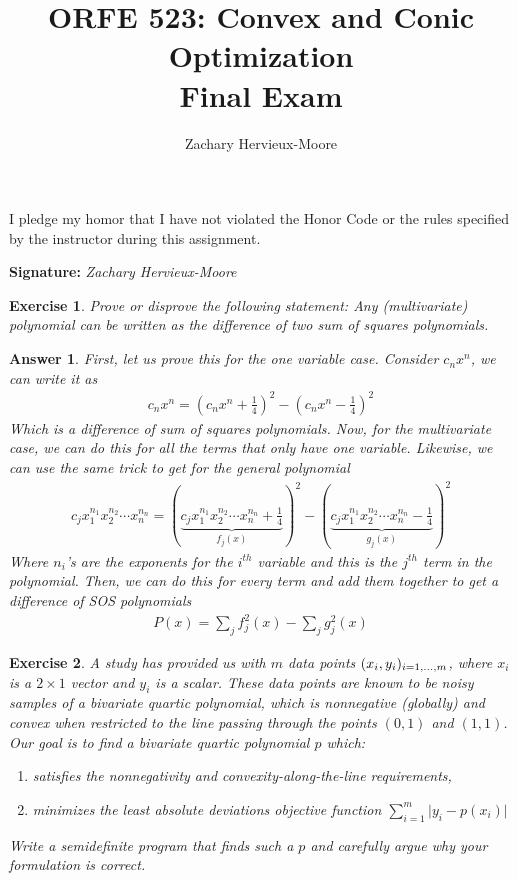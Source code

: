 \documentclass[12pt]{article}
\title{ORFE 523: Convex and Conic Optimization \\ Final Exam}
\author{Zachary Hervieux-Moore}
\date{\displaydate{date}}
\theoremstyle{colon}
\newtheorem{exercise}{Exercise}
\newtheorem*{answer}{Answer}
\begin{document}
\maketitle

I pledge my homor that I have not violated the Honor Code or the rules specified by the instructor during this assignment.

\textbf{Signature: } \textit{Zachary Hervieux-Moore}

\clearpage

\begin{exercise}
  Prove or disprove the following statement: Any (multivariate) polynomial can be written as the difference of two sum of squares polynomials.
\end{exercise}

\begin{answer}
  First, let us prove this for the one variable case. Consider $c_n x^n$, we can write it as
  \begin{gather*}
    c_n x^n = \left(c_n x^n + \frac{1}{4} \right)^2 - \left(c_n x^n - \frac{1}{4} \right)^2
  \end{gather*}
  Which is a difference of sum of squares polynomials. Now, for the multivariate case, we can do this for all the terms that only have one variable. Likewise, we can use the same trick to get for the general polynomial
  \begin{gather*}
    c_j x_1^{n_1} x_2^{n_2} \cdots x_n^{n_n} = \left(\underbrace{c_j x_1^{n_1} x_2^{n_2} \cdots x_n^{n_n} + \frac{1}{4}}_{f_j(x)} \right)^2 - \left( \underbrace{c_j x_1^{n_1} x_2^{n_2} \cdots x_n^{n_n} - \frac{1}{4}}_{g_j(x)} \right)^2
  \end{gather*}
  Where $n_i$'s are the exponents for the $i^{th}$ variable and this is the $j^{th}$ term in the polynomial. Then, we can do this for every term and add them together to get a difference of SOS polynomials
  \begin{gather*}
    P(x) = \sum_{j} f_j^2(x) - \sum_{j} g_j^2(x)
  \end{gather*}
\end{answer}

\clearpage

\begin{exercise}
  A study has provided us with $m$ data points $(x_i, y_i)_{i=1,\mathellipsis,m}$, where $x_i$ is a $2 \times 1$ vector and $y_i$ is a scalar. These data points are known to be noisy samples of a bivariate quartic polynomial, which is nonnegative (globally) and convex when restricted to the line passing through the points $(0,1)$ and $(1,1)$. Our goal is to find a bivariate quartic polynomial $p$ which:
  \begin{enumerate}[label=\roman*)]
    \item satisfies the nonnegativity and convexity-along-the-line requirements,
    \item minimizes the least absolute deviations objective function $\sum_{i=1}^m \lvert y_i - p(x_i) \rvert$
  \end{enumerate}
  Write a semidefinite program that finds such a $p$ and carefully argue why your formulation is correct.
\end{exercise}
\end{document}
